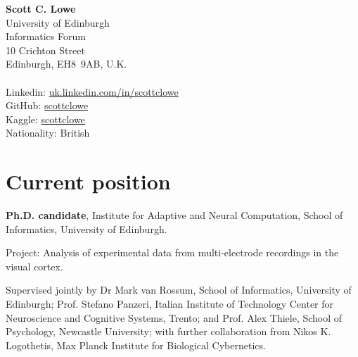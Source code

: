 \documentclass[11pt, a4paper]{article} %
\newcommand{\withindent}{\setlength\parindent{15pt}}
\begin{document}
%
%
\textbf{\LARGE Scott C. Lowe}\\[1cm] %
%
University of Edinburgh\\
Informatics Forum\\
10 Crichton Street\\
Edinburgh, EH8~9AB, U.K.
%
\\[.2cm]
%
%
\\[.2cm]
%
Linkedin: \href{https://uk.linkedin.com/in/scottclowe}{uk.linkedin.com/in/scottclowe}\\
GitHub: \href{https://github.com/scottclowe}{scottclowe}\\
Kaggle: \href{https://www.kaggle.com/scottclowe}{scottclowe}\\
%
%

Nationality: British %
%
\\%


\section*{Current position}

\textbf{Ph.D. candidate}, Institute for Adaptive and Neural Computation, School of Informatics, University of Edinburgh.

\withindent%
Project: Analysis of experimental data from multi-electrode recordings in the visual cortex.

\withindent%
Supervised jointly by Dr Mark van Rossum, School of Informatics, University of Edinburgh; Prof. Stefano Panzeri, Italian Institute of Technology Center for Neuroscience and Cognitive Systems, Trento; and Prof. Alex Thiele, School of Psychology, Newcastle University; with further collaboration from Nikos K. Logothetis, Max Planck Institute for Biological Cybernetics.
\end{document}
